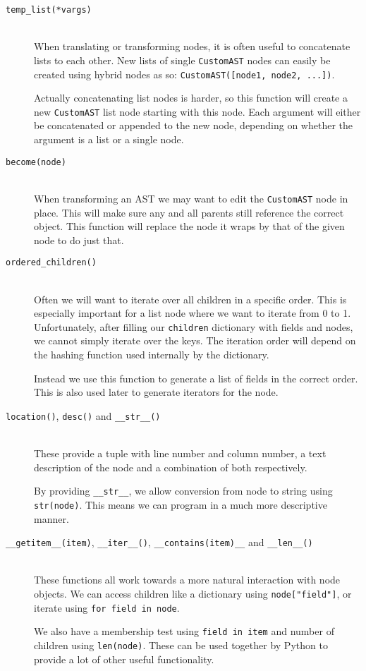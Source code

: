 \documentclass{report}
\begin{document}
\begin{description}
\item[\texttt{temp\_list(*vargs)}] \hfill \\
When translating or transforming nodes, it is often useful to concatenate lists to each other. New lists of single \texttt{CustomAST} nodes can easily be
created using hybrid nodes as so: \texttt{CustomAST([node1, node2, ...])}.

Actually concatenating list nodes is harder, so this function will create a new \texttt{CustomAST} list node starting with this node. Each argument will either be
concatenated or appended to the new node, depending on whether the argument is a list or a single node.

\item[\texttt{become(node)}] \hfill \\
When transforming an AST we may want to edit the \texttt{CustomAST} node in place. This will make sure any and all parents still reference the correct
object. This function will replace the node it wraps by that of the given node to do just that.

\item[\texttt{ordered\_children()}] \hfill \\
Often we will want to iterate over all children in a specific order. This is especially important for a list node where we want to iterate from 0 to 1.
Unfortunately, after filling our \texttt{children} dictionary with fields and nodes, we cannot simply iterate over the keys. The iteration order will
depend on the hashing function used internally by the dictionary.

Instead we use this function to generate a list of fields in the correct order. This is also used later to generate iterators for the node.

\item[\texttt{location()}, \texttt{desc()} and \texttt{\_\_str\_\_()}] \hfill \\
These provide a tuple with line number and column number, a text description of the node and a combination of both respectively.

By providing \texttt{\_\_str\_\_}, we allow conversion from node to string using \texttt{str(node)}. This means we can program in a much more
descriptive manner.

\item[\texttt{\_\_getitem\_\_(item)}, \texttt{\_\_iter\_\_()}, \texttt{\_\_contains(item)\_\_} and \texttt{\_\_len\_\_()}] \hfill \\
These functions all work towards a more natural interaction with node objects. We can access children like a dictionary using \texttt{node["field"]}, or
iterate using \texttt{for field in node}.

We also have a membership test using \texttt{field in item} and number of children using \texttt{len(node)}. These can be used together by Python to provide
a lot of other useful functionality.

\end{description}
\end{document}
